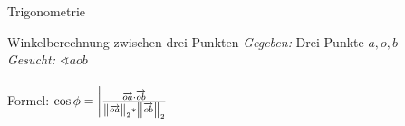 \begin{frame}{Trigonometrie}
	\begin{block}{Winkelberechnung zwischen drei Punkten}
		\textit{Gegeben:} Drei Punkte $a, o, b$\\
		\textit{Gesucht:} $\sphericalangle aob$\\ \ \\

		Formel: $\cos \phi = \left|\frac{\overrightarrow{oa} \cdot \overrightarrow{ob}}{\left\|\overrightarrow{oa}\right\|_2 * \left\|\overrightarrow{ob}\right\|_2}\right|$\\
	\end{block}
	
	\lstset{
		language=C++,
		tabsize=1
	}
	
\end{frame}
